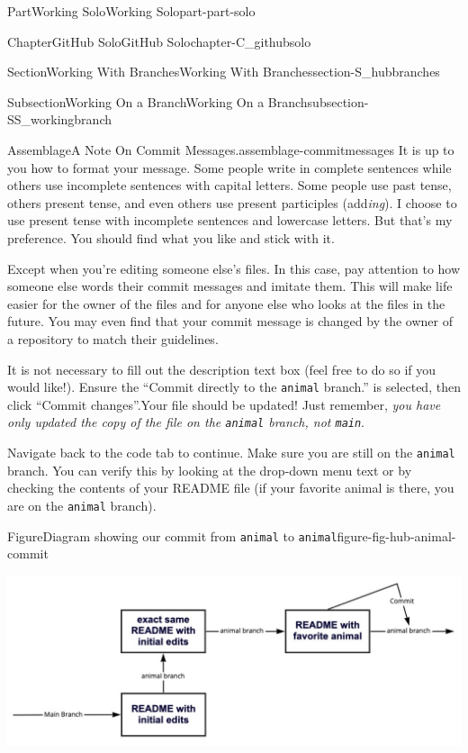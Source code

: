 \documentclass[twoside,10pt,]{book}
\newcommand{\mono}[1]{\texttt{#1}}
\begin{document}
\begin{partptx}{Part}{Working Solo}{}{Working Solo}{}{}{part-part-solo}
\begin{chapterptx}{Chapter}{GitHub Solo}{}{GitHub Solo}{}{}{chapter-C_githubsolo}
\begin{sectionptx}{Section}{Working With Branches}{}{Working With Branches}{}{}{section-S_hubbranches}
\begin{subsectionptx}{Subsection}{Working On a Branch}{}{Working On a Branch}{}{}{subsection-SS_workingbranch}
\begin{assemblage}{Assemblage}{A Note On Commit Messages.}{assemblage-commitmessages}
It is up to you how to format your message. Some people write in complete sentences while others use incomplete sentences with capital letters. Some people use past tense, others present tense, and even others use present participles (add\emph{ing}). I choose to use present tense with incomplete sentences and lowercase letters. But that's my preference. You should find what you like and stick with it.%
\par
\textellipsis{}Except when you're editing someone else's files. In this case, pay attention to how someone else words their commit messages and imitate them. This will make life easier for the owner of the files and for anyone else who looks at the files in the future. You may even find that your commit message is changed by the owner of a repository to match their guidelines.%
\end{assemblage}
It is not necessary to fill out the description text box (feel free to do so if you would like!). Ensure the ``Commit directly to the \mono{animal} branch.'' is selected, then click ``Commit changes''.Your file should be updated! Just remember, \emph{you have only updated the copy of the file on the \mono{animal} branch, not \mono{main}}.%
\par
Navigate back to the code tab to continue. Make sure you are still on the \mono{animal} branch. You can verify this by looking at the drop-down menu text or by checking the contents of your README file (if your favorite animal is there, you are on the \mono{animal} branch).%
\begin{figureptx}{Figure}{Diagram showing our commit from \mono{animal} to \mono{animal}}{figure-fig-hub-animal-commit}{}%
\begin{image}{0.05}{0.9}{0.05}{}%
\includegraphics[width=\linewidth]{external/hub_animal_commit.pdf}
\end{image}%
\tcblower
\end{figureptx}%
\end{subsectionptx}
%
%
\typeout{************************************************}

\end{sectionptx}
\end{chapterptx}
\end{partptx}
\end{document}
